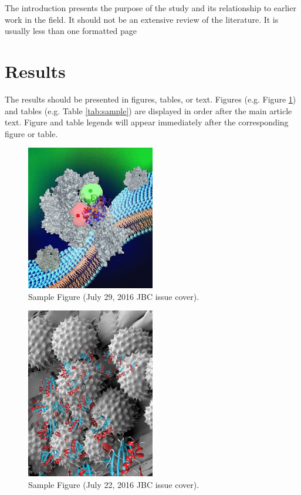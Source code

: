 \documentclass{jbc-article}
\begin{document}
\begin{article}
The introduction presents the purpose of the study and its relationship to earlier work in the field. It should not be an extensive review of the literature. It is usually less than one formatted page

\section{Results}

The results should be presented in figures, tables, or text. Figures (e.g. Figure \ref{fig:july29cover}) and tables (e.g. Table \ref{tab:sample}) are displayed in order after the main article text. Figure and table legends will appear immediately after the corresponding figure or table.

\begin{figure}[hbtp!]\centering
\includegraphics[width=0.5\textwidth]{figures/jbc-cover-20160729.jpg}
\caption{Sample Figure (July 29, 2016 JBC issue cover).}
\label{fig:july29cover}
\end{figure}

\begin{figure}[hbtp!]\centering
\includegraphics[width=0.5\textwidth]{figures/jbc-cover-20160722.jpg}
\caption{Sample Figure (July 22, 2016 JBC issue cover).}
\label{fig:july22cover}
\end{figure}


\end{article}
\end{document}
